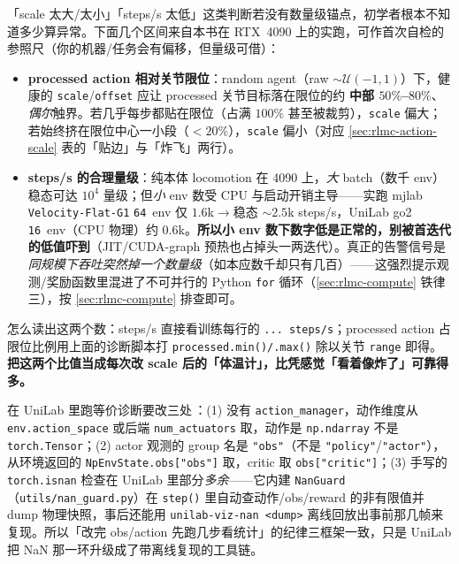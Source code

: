 \begin{insight}\label{ins:rlmc-healthy-range}
「scale 太大/太小」「steps/s 太低」这类判断若没有数量级锚点，初学者根本不知道多少算异常。下面几个区间来自本书在 RTX~4090 上的实跑，可作首次自检的参照尺（你的机器/任务会有偏移，但量级可借）：
\begin{itemize}
  \item \textbf{processed action 相对关节限位}：random agent（raw $\sim\mathcal U(-1,1)$）下，健康的 \verb|scale|/\verb|offset| 应让 processed 关节目标落在限位的约 \textbf{中部 $50\%$--$80\%$}、\emph{偶尔}触界。若几乎每步都贴在限位（占满 $100\%$ 甚至被裁剪），\verb|scale| 偏大；若始终挤在限位中心一小段（$<20\%$），\verb|scale| 偏小（对应 \cref{sec:rlmc-action-scale} 表的「贴边」与「炸飞」两行）。
  \item \textbf{steps/s 的合理量级}：纯本体 locomotion 在 4090 上，\emph{大} batch（数千 env）稳态可达 $10^4$ 量级；但\emph{小} env 数受 CPU 与启动开销主导——实跑 mjlab \verb|Velocity-Flat-G1| \texttt{64}~env 仅 $1.6$k$\to$稳态 $\sim\!2.5$k steps/s，UniLab go2 \texttt{16}~env（CPU 物理）约 $0.6$k。\textbf{所以小 env 数下数字低是正常的，别被首迭代的低值吓到}（JIT/CUDA-graph 预热也占掉头一两迭代）。真正的告警信号是\emph{同规模下吞吐突然掉一个数量级}（如本应数千却只有几百）——这强烈提示观测/奖励函数里混进了不可并行的 Python \verb|for| 循环（\cref{sec:rlmc-compute} 铁律三），按 \cref{sec:rlmc-compute} 排查即可。
\end{itemize}
怎么读出这两个数：steps/s 直接看训练每行的 \texttt{... steps/s}；processed action 占限位比例用上面的诊断脚本打 \verb|processed.min()/.max()| 除以关节 \verb|range| 即得。\textbf{把这两个比值当成每次改 scale 后的「体温计」，比凭感觉「看着像炸了」可靠得多。}
\end{insight}

在 UniLab 里跑等价诊断要改三处\,\cite{unilab2026}：(1) 没有 \verb|action_manager|，动作维度从 \verb|env.action_space| 或后端 \verb|num_actuators| 取，动作是 \verb|np.ndarray| 不是 \verb|torch.Tensor|；(2) actor 观测的 group 名是 \verb|"obs"|（不是 \verb|"policy"|/\verb|"actor"|），从环境返回的 \verb|NpEnvState.obs["obs"]| 取，critic 取 \verb|obs["critic"]|；(3) 手写的 \verb|torch.isnan| 检查在 UniLab 里部分\emph{多余}——它内建 \verb|NanGuard|（\verb|utils/nan_guard.py|）在 \verb|step()| 里自动查动作/obs/reward 的非有限值并 dump 物理快照，事后还能用 \verb|unilab-viz-nan <dump>| 离线回放出事前那几帧来复现。所以「改完 obs/action 先跑几步看统计」的纪律三框架一致，只是 UniLab 把 NaN 那一环升级成了带离线复现的工具链。

